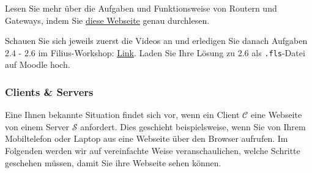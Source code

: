 \begin{myexercise}
	Lesen Sie mehr über die Aufgaben und Funktionsweise von Routern und Gateways, indem Sie \href{https://inf-schule.de/rechnernetze/filius/vernetzungrechnernetze/konzept_router}{diese Webseite} genau durchlesen.
\end{myexercise}

\begin{myexercise}
	Schauen Sie sich jeweils zuerst die Videos an und erledigen Sie danach Aufgaben 2.4 - 2.6 im Filius-Workshop: \href{https://informatik.mygymer.ch/base/?book=network}{Link}. Laden Sie Ihre Lösung zu 2.6 als \texttt{.fls}-Datei auf Moodle hoch.
\end{myexercise}


\subsubsection{Clients \& Servers}
Eine Ihnen bekannte Situation findet sich vor, wenn ein Client $\mathcal{C}$ eine Webseite von einem Server $\mathcal{S}$ anfordert. Dies geschieht beispielsweise, wenn Sie von Ihrem Mobiltelefon oder Laptop aus eine Webseite über den Browser aufrufen. Im Folgenden werden wir auf vereinfachte Weise veranschaulichen, welche Schritte geschehen müssen, damit Sie ihre Webseite sehen können.


